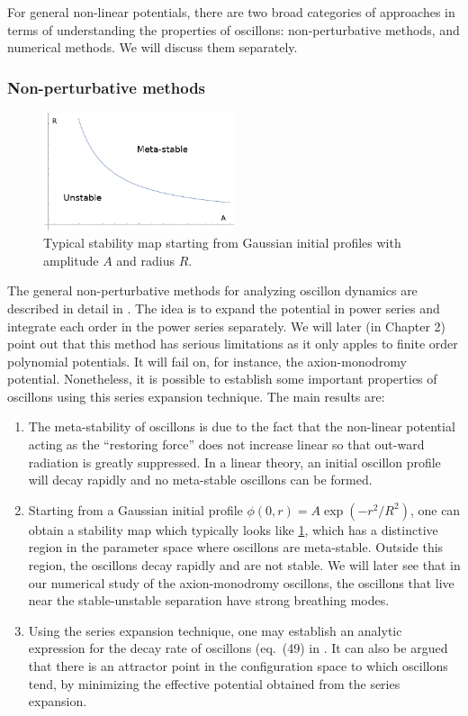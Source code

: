 \documentclass{report}
\begin{document}
For general non-linear potentials, there are two broad categories of approaches in terms of understanding the properties of oscillons: non-perturbative methods, and numerical methods. We will discuss them separately.

\subsubsection{Non-perturbative methods}\label{nonpert}
\begin{figure}\centering
  \includegraphics[width=0.5\textwidth]{plot/stability.png}
  \caption{Typical stability map starting from Gaussian initial profiles with amplitude $A$ and radius $R$.}
  \label{stability}
\end{figure}

The general non-perturbative methods for analyzing oscillon dynamics are described in detail in \cite{Copeland:1995fq, PhysRevD.80.125037, Gleiser:2008ty}. The idea is to expand the potential in power series and integrate each order in the power series separately. We will later (in Chapter 2) point out that this method has serious limitations as it only apples to finite order polynomial potentials. It will fail on, for instance, the axion-monodromy potential. Nonetheless, it is possible to establish some important properties of oscillons using this series expansion technique. The main results are:
\begin{enumerate}
\item The meta-stability of oscillons is due to the fact that the non-linear potential acting as the ``restoring force'' does not increase linear so that out-ward radiation is greatly suppressed. In a linear theory, an initial oscillon profile will decay rapidly and no meta-stable oscillons can be formed.
\item Starting from a Gaussian initial profile $\phi(0,r)=A\exp(-r^2/R^2)$, one can obtain a stability map which typically looks like \ref{stability}, which has a distinctive region in the parameter space where oscillons are meta-stable. Outside this region, the oscillons decay rapidly and are not stable. We will later see that in our numerical study of the axion-monodromy oscillons, the oscillons that live near the stable-unstable separation have strong breathing modes.
\item Using the series expansion technique, one may establish an analytic expression for the decay rate of oscillons (eq.~(49) in \cite{PhysRevD.80.125037}. It can also be argued that there is an attractor point in the configuration space to which oscillons tend, by minimizing the effective potential obtained from the series expansion.
\end{enumerate}
\end{document}
